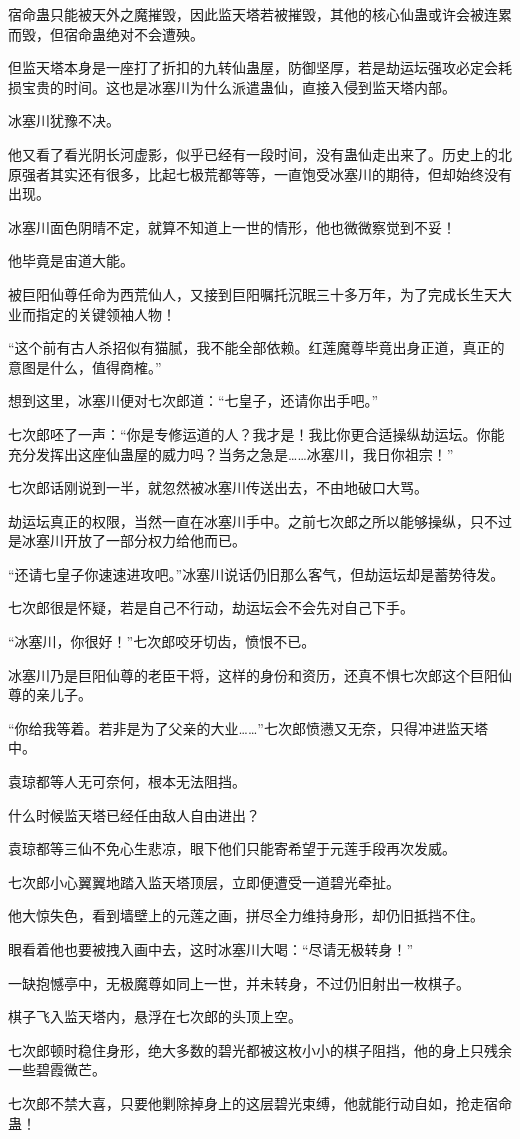 \begin{this_body}
宿命蛊只能被天外之魔摧毁，因此监天塔若被摧毁，其他的核心仙蛊或许会被连累而毁，但宿命蛊绝对不会遭殃。

但监天塔本身是一座打了折扣的九转仙蛊屋，防御坚厚，若是劫运坛强攻必定会耗损宝贵的时间。这也是冰塞川为什么派遣蛊仙，直接入侵到监天塔内部。

冰塞川犹豫不决。

他又看了看光阴长河虚影，似乎已经有一段时间，没有蛊仙走出来了。历史上的北原强者其实还有很多，比起七极荒都等等，一直饱受冰塞川的期待，但却始终没有出现。

冰塞川面色阴晴不定，就算不知道上一世的情形，他也微微察觉到不妥！

他毕竟是宙道大能。

被巨阳仙尊任命为西荒仙人，又接到巨阳嘱托沉眠三十多万年，为了完成长生天大业而指定的关键领袖人物！

“这个前有古人杀招似有猫腻，我不能全部依赖。红莲魔尊毕竟出身正道，真正的意图是什么，值得商榷。”

想到这里，冰塞川便对七次郎道：“七皇子，还请你出手吧。”

七次郎呸了一声：“你是专修运道的人？我才是！我比你更合适操纵劫运坛。你能充分发挥出这座仙蛊屋的威力吗？当务之急是……冰塞川，我日你祖宗！”

七次郎话刚说到一半，就忽然被冰塞川传送出去，不由地破口大骂。

劫运坛真正的权限，当然一直在冰塞川手中。之前七次郎之所以能够操纵，只不过是冰塞川开放了一部分权力给他而已。

“还请七皇子你速速进攻吧。”冰塞川说话仍旧那么客气，但劫运坛却是蓄势待发。

七次郎很是怀疑，若是自己不行动，劫运坛会不会先对自己下手。

“冰塞川，你很好！”七次郎咬牙切齿，愤恨不已。

冰塞川乃是巨阳仙尊的老臣干将，这样的身份和资历，还真不惧七次郎这个巨阳仙尊的亲儿子。

“你给我等着。若非是为了父亲的大业……”七次郎愤懑又无奈，只得冲进监天塔中。

袁琼都等人无可奈何，根本无法阻挡。

什么时候监天塔已经任由敌人自由进出？

袁琼都等三仙不免心生悲凉，眼下他们只能寄希望于元莲手段再次发威。

七次郎小心翼翼地踏入监天塔顶层，立即便遭受一道碧光牵扯。

他大惊失色，看到墙壁上的元莲之画，拼尽全力维持身形，却仍旧抵挡不住。

眼看着他也要被拽入画中去，这时冰塞川大喝：“尽请无极转身！”

一缺抱憾亭中，无极魔尊如同上一世，并未转身，不过仍旧射出一枚棋子。

棋子飞入监天塔内，悬浮在七次郎的头顶上空。

七次郎顿时稳住身形，绝大多数的碧光都被这枚小小的棋子阻挡，他的身上只残余一些碧霞微芒。

七次郎不禁大喜，只要他剿除掉身上的这层碧光束缚，他就能行动自如，抢走宿命蛊！

\end{this_body}

